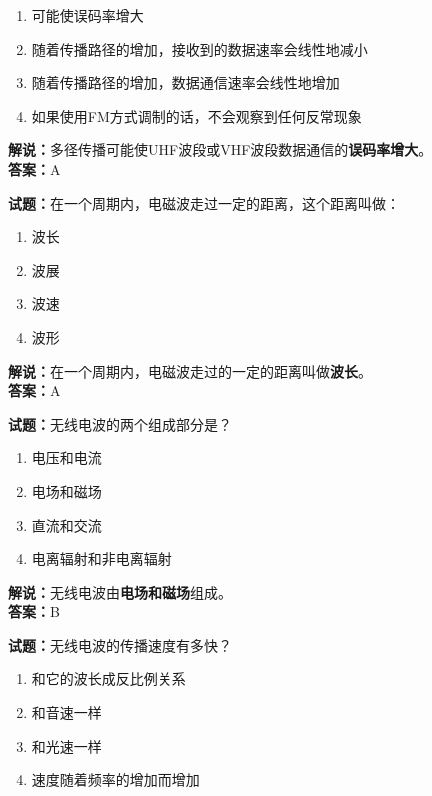 \documentclass{ctexbook}
\begin{document}
\begin{enumerate}[leftmargin=3em]
	\item 可能使误码率增大
	\item 随着传播路径的增加，接收到的数据速率会线性地减小
	\item 随着传播路径的增加，数据通信速率会线性地增加
	\item 如果使用FM方式调制的话，不会观察到任何反常现象
\end{enumerate}

\noindent\textbf{解说：}多径传播可能使UHF波段或VHF波段数据通信的\textbf{误码率增大}。\\\noindent\textbf{答案：}A


\bigskip


\noindent\textbf{试题：}在一个周期内，电磁波走过一定的距离，这个距离叫做：

\begin{enumerate}[leftmargin=3em]
	\item 波长
	\item 波展
	\item 波速
	\item 波形
\end{enumerate}

\noindent\textbf{解说：}在一个周期内，电磁波走过的一定的距离叫做\textbf{波长}。\\\noindent\textbf{答案：}A


\bigskip


\noindent\textbf{试题：}无线电波的两个组成部分是？

\begin{enumerate}[leftmargin=3em]
	\item 电压和电流
	\item 电场和磁场
	\item 直流和交流
	\item 电离辐射和非电离辐射
\end{enumerate}

\noindent\textbf{解说：}无线电波由\textbf{电场和磁场}组成。\\\noindent\textbf{答案：}B


\bigskip


\noindent\textbf{试题：}无线电波的传播速度有多快？

\begin{enumerate}[leftmargin=3em]
	\item 和它的波长成反比例关系
	\item 和音速一样
	\item 和光速一样
	\item 速度随着频率的增加而增加
\end{enumerate}
\end{document}
